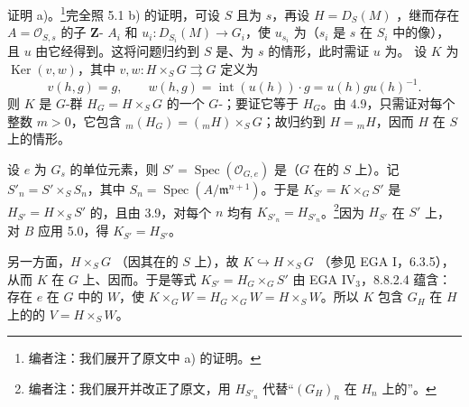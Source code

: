 证明 a)。\footnote{编者注：我们展开了原文中 a) 的证明。}完全照 5.1 b) 的证明，可设 $S$ 且为 $s$，再设 $H=D_S(M)$ ，继而存在 $A=\mathcal O_{S,s}$ 的子 $\mathbf Z$- $A_i$ 和 $u_i:D_{S_i}(M)\to G_i$，使 $u_{s_i}$ 为（$s_i$ 是 $s$ 在 $S_i$ 中的像），且 $u$ 由它经得到。这将问题归约到 $S$ 是、为 $s$ 的情形，此时需证 $u$ 为。
设 $K$ 为 $\operatorname{Ker}(v,w)$，其中 $v,w:H\times_S G\rightrightarrows G$ 定义为
\[v(h,g)=g,\qquad w(h,g)=\operatorname{int}(u(h))\cdot g=u(h)gu(h)^{-1}.\]
则 $K$ 是 $G$-群 $H_G=H\times_S G$ 的一个 $G$-；要证它等于 $H_G$。由 4.9，只需证对每个整数 $m>0$，它包含 ${}_m(H_G)=({}_mH)\times_S G$；故归约到 $H={}_mH$，因而 $H$ 在 $S$ 上的情形。

设 $e$ 为 $G_s$ 的单位元素，则 $S'=\operatorname{Spec}(\mathcal O_{G,e})$ 是（$G$ 在的 $S$ 上）。记 $S'_n=S'\times_S S_n$，其中 $S_n=\operatorname{Spec}(A/\mathfrak m^{n+1})$。于是 $K_{S'}=K\times_G S'$ 是 $H_{S'}=H\times_S S'$ 的，且由 3.9，对每个 $n$ 均有 $K_{S'_n}=H_{S'_n}$。\footnote{编者注：我们展开并改正了原文，用 $H_{S'_n}$ 代替“$(G_H)_n$ 在 $H_n$ 上的”。}因为 $H_{S'}$ 在 $S'$ 上，对 $B$ 应用 5.0，得 $K_{S'}=H_{S'}$。

另一方面，$H\times_S G$ （因其在的 $S$ 上），故 $K\hookrightarrow H\times_S G$ （参见 EGA I，6.3.5），从而 $K$ 在 $G$ 上、因而。于是等式 $K_{S'}=H_G\times_G S'$ 由 EGA IV$_3$，8.8.2.4 蕴含：存在 $e$ 在 $G$ 中的 $W$，使 $K\times_G W=H_G\times_G W=H\times_S W$。所以 $K$ 包含 $G_H$ 在 $H$ 上的的 $V=H\times_S W$。

